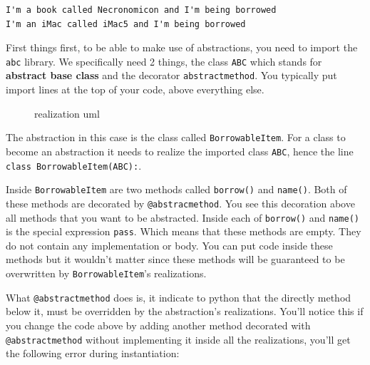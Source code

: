 \begin{Shaded}
\begin{Highlighting}[]
    \NormalTok{) }\OperatorTok{{-}\textgreater{}} \NormalTok{:}
          \OperatorTok{+} \NormalTok{(}\NormalTok{)}


\OperatorTok{=}\NormalTok{)}
\OperatorTok{=}\NormalTok{)}

\end{Highlighting}
\end{Shaded}

\begin{verbatim}
I'm a book called Necronomicon and I'm being borrowed
I'm an iMac called iMac5 and I'm being borrowed
\end{verbatim}

First things first, to be able to make use of abstractions, you need to
import the \texttt{abc} library. We specifically need 2 things, the
class \texttt{ABC} which stands for \textbf{abstract base class} and the
decorator \texttt{abstractmethod}. You typically put import lines at the
top of your code, above everything else.

\begin{figure}
\centering
\pandocbounded{}
\caption{realization uml}
\end{figure}

The abstraction in this case is the class called
\texttt{BorrowableItem}. For a class to become an abstraction it needs
to realize the imported class \texttt{ABC}, hence the line
\texttt{class\ BorrowableItem(ABC):}.

Inside \texttt{BorrowableItem} are two methods called \texttt{borrow()}
and \texttt{name()}. Both of these methods are decorated by
\texttt{@abstracmethod}. You see this decoration above all methods that
you want to be abstracted. Inside each of \texttt{borrow()} and
\texttt{name()} is the special expression \texttt{pass}. Which means
that these methods are empty. They do not contain any implementation or
body. You can put code inside these methods but it wouldn't matter since
these methods will be guaranteed to be overwritten by
\texttt{BorrowableItem}'s realizations.

What \texttt{@abstractmethod} does is, it indicate to python that the
directly method below it, must be overridden by the abstraction's
realizations. You'll notice this if you change the code above by adding
another method decorated with \texttt{@abstractmethod} without
implementing it inside all the realizations, you'll get the following
error during instantiation:

